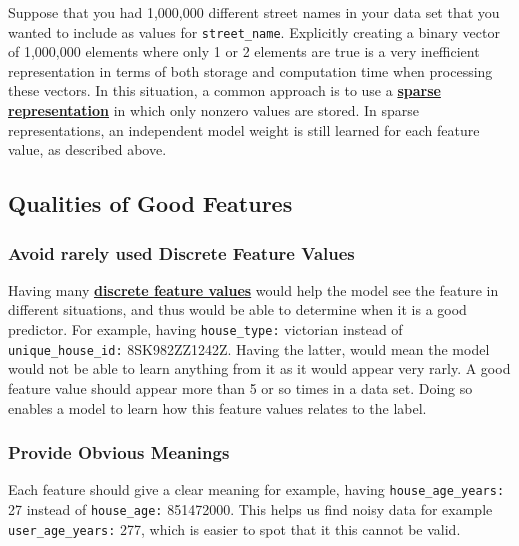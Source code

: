 \documentclass[12pt]{article}
\begin{document}
Suppose that you had 1,000,000 different street names in your data set that you wanted to include as values for {\tt{street\_name}}. Explicitly creating a binary vector of 1,000,000 elements where only 1 or 2 elements are true is a very inefficient representation in terms of both storage and computation time when processing these vectors. In this situation, a common approach is to use a \href{https://developers.google.com/machine-learning/glossary#sparse_representation}{\textbf{sparse representation}} in which only nonzero values are stored. In sparse representations, an independent model weight is still learned for each feature value, as described above.

\subsection{Qualities of Good Features}

\subsubsection{Avoid rarely used Discrete Feature Values}
Having many \href{https://developers.google.com/machine-learning/glossary#discrete_feature}{\textbf{discrete feature values}} would help the model see the feature in different situations, and thus would be able to determine when it is a good predictor.
For example, having {\tt{house\_type:}} victorian instead of {\tt{unique\_house\_id:}} 8SK982ZZ1242Z. Having the latter, would mean the model would not be able to learn anything from it as it would appear very rarly. A good feature value should appear more than 5 or so times in a data set. Doing so enables a model to learn how this feature values relates to the label.

\subsubsection{Provide Obvious Meanings}
Each feature should give a clear meaning for example, having {\tt{house\_age\_years:}} 27 instead of {\tt{house\_age:}} 851472000. This helps us find noisy data for example {\tt{user\_age\_years:}} 277, which is easier to spot that it this cannot be valid.
\end{document}
